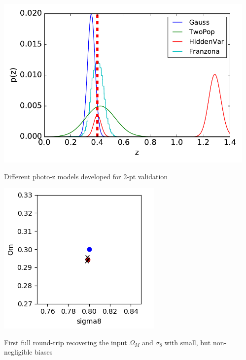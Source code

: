 \documentclass[aspectratio=169]{beamer}
\begin{document}
\begin{frame}
\begin{columns}
\begin{column}{8cm}
    \end{column}
    \begin{column}{4cm}
      \includegraphics[width=\linewidth]{./ptest04.pdf}
      \vspace*{-0.3cm}
      \begin{center}
        \tiny Different photo-z models developed for 2-pt validation
      \end{center}

      \begin{center}
        \includegraphics[width=0.8\linewidth]{./xx.png}

        \tiny First full round-trip recovering the input $\Omega_M$
        and $\sigma_8$ with small, but non-negligible biases

      \end{center}
    \end{column}
  \end{columns}
\end{frame}
\end{document}
